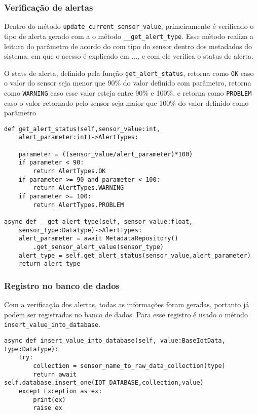 \subsubsection{Verificação de alertas}

Dentro do método \texttt{update\_current\_sensor\_value}, primeiramente é verificado o tipo de alerta gerado com a o método  \texttt{\_\_get\_alert\_type}.
Esse método realiza a leitura do parâmetro de acordo do com tipo do sensor dentro dos metadados do sistema, em que o acesso é explicado em ..., e com ele verifica o status de alerta. 

O stats de alerta, definido pela função  \texttt{get\_alert\_status}, retorna como \texttt{OK} caso o valor do sensor seja menor que 90\% do valor definido com parâmetro, retorna como \texttt{WARNING} caso esse valor esteja entre 90\% e 100\%, e retorna como \texttt{PROBLEM} caso o valor retornado pelo sensor seja maior que 100\% do valor definido como parâmetro

\begin{verbatim}
def get_alert_status(self,sensor_value:int,
    alert_parameter:int)->AlertTypes:

    parameter = ((sensor_value/alert_parameter)*100)
    if parameter < 90:
        return AlertTypes.OK
    if parameter >= 90 and parameter < 100:
        return AlertTypes.WARNING
    if parameter >= 100:
        return AlertTypes.PROBLEM

async def __get_alert_type(self, sensor_value:float,
    sensor_type:Datatype)->AlertTypes:
    alert_parameter = await MetadataRepository()
        .get_sensor_alert_value(sensor_type)
    alert_type = self.get_alert_status(sensor_value,alert_parameter)
    return alert_type
\end{verbatim}


\subsubsection{Registro no banco de dados}

Com a verificação dos alertas, todas as informações foram geradas, portanto já podem ser registradas no banco de dados. Para esse registro é usado o método \texttt{insert\_value\_into\_database}.

\begin{verbatim}
async def insert_value_into_database(self, value:BaseIotData, type:Datatype):
    try:
        collection = sensor_name_to_raw_data_collection(type)
        return await self.database.insert_one(IOT_DATABASE,collection,value)
    except Exception as ex:
        print(ex)
        raise ex
\end{verbatim}

